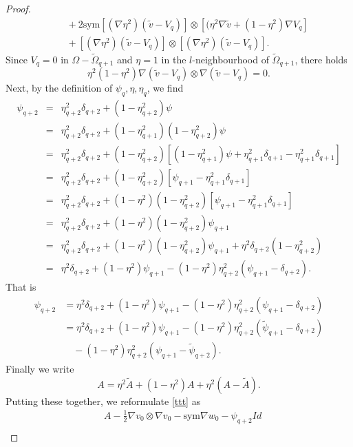 \documentclass[reqno,12pt]{amsart}
\numberwithin{equation}{section}
\theoremstyle{plain}
\theoremstyle{definition}
\newcommand{\sym}{\text{sym}}
\begin{document}
\begin{proof}
\begin{align*}
    &\quad +2\sym[(\nabla \eta^2)(\tilde v-V_q)]\otimes[(\eta^2\nabla\tilde v+(1-\eta^2)\nabla V_q]\\
    &\quad +[(\nabla \eta^2)(\tilde v-V_q)]\otimes[(\nabla \eta^2)(\tilde v-V_q)].
\end{align*}
Since $V_q=0$ in $\Omega-\tilde\Omega_{q+1}$ and $\eta=1$ in the $l$-neighbourhood of $\tilde\Omega_{q+1}$, there holds
\begin{equation*}
    \eta^2(1-\eta^2)\nabla(\tilde v-V_q)\otimes\nabla(\tilde v-V_q) =0.
\end{equation*}
Next, by the definition of $\psi_q,\eta,\eta_q$, we find
\begin{eqnarray*}
    \psi_{q+2}  &=&  \eta^2_{q+2} \delta_{q+2} +(1-\eta^2_{q+2}) \psi\\
    &=& \eta^2_{q+2} \delta_{q+2} +(1-\eta^2_{q+1})(1-\eta^2_{q+2}) \psi \\
    &=& \eta^2_{q+2} \delta_{q+2} + (1-\eta^2_{q+2})[ (1-\eta^2_{q+1})\psi +\eta^2_{q+1}\delta_{q+1}-\eta^2_{q+1}\delta_{q+1}]\\
    &=& \eta^2_{q+2} \delta_{q+2} + (1-\eta^2_{q+2})[ \psi_{q+1}-\eta^2_{q+1}\delta_{q+1}]\\
     &=& \eta^2_{q+2} \delta_{q+2} + (1-\eta^2)(1-\eta^2_{q+2})[ \psi_{q+1}-\eta^2_{q+1}\delta_{q+1}]\\
     &=& \eta^2_{q+2} \delta_{q+2} + (1-\eta^2)(1-\eta^2_{q+2})\psi_{q+1}\\
     &=& \eta^2_{q+2} \delta_{q+2} + (1-\eta^2)(1-\eta^2_{q+2})\psi_{q+1}+\eta^2 \delta_{q+2} (1-\eta^2_{q+2})\\
    &=& \eta^2\delta_{q+2} +(1-\eta^2)\psi_{q+1} - (1-\eta^2)\eta_{q+2}^2(\psi_{q+1}-\delta_{q+2}).
\end{eqnarray*}
That is
\begin{align*}
    \psi_{q+2} &= \eta^2\delta_{q+2}+(1-\eta^2)\psi_{q+1} -(1-\eta^2)\eta_{q+2}^2(\psi_{q+1}-\delta_{q+2})\\
    &= \eta^2\delta_{q+2}+(1-\eta^2)\psi_{q+1} -(1-\eta^2)\eta_{q+2}^2(\tilde\psi_{q+1}-\delta_{q+2})\\
    &\quad -(1-\eta^2)\eta_{q+2}^2(\psi_{q+1}-\tilde\psi_{q+2}).
\end{align*}
Finally we write
\begin{equation*}
A=\eta^2 \tilde A +(1-\eta^2)A +\eta^2(A-\tilde A).
\end{equation*}
Putting these together, we reformulate \eqref{ttt} as
\begin{align*}
    &A-\frac{1}{2}\nabla v_0\otimes\nabla v_0-\sym\nabla w_0-\psi_{q+2}Id\\

\end{align*}
\end{proof}
\end{document}
